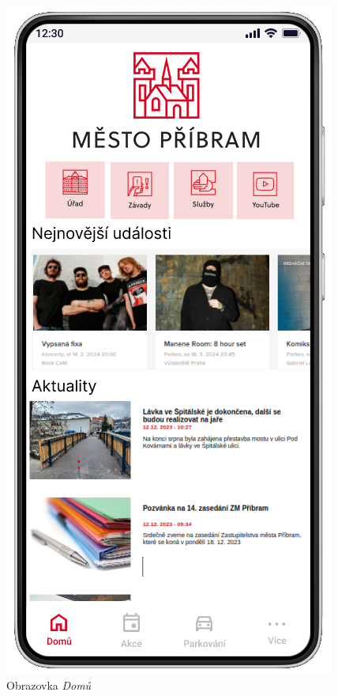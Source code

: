 \begin{minipage}[t]{0.45\textwidth}
  \begin{figure}[H]
    \centering
    \includegraphics[width=.7\textwidth]{screen1.png}
    \caption{Obrazovka \textit{Domů}}
    \label{fig:mockup1}
  \end{figure}
  \begin{figure}[H]
    \centering

\end{figure}
\end{minipage}
